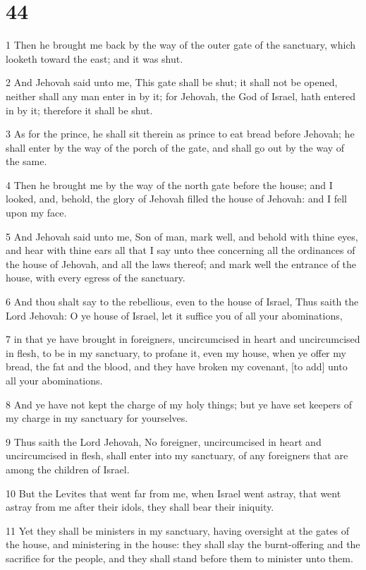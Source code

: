 \chapter{44}

\par 1 Then he brought me back by the way of the outer gate of the sanctuary, which looketh toward the east; and it was shut.
\par 2 And Jehovah said unto me, This gate shall be shut; it shall not be opened, neither shall any man enter in by it; for Jehovah, the God of Israel, hath entered in by it; therefore it shall be shut.
\par 3 As for the prince, he shall sit therein as prince to eat bread before Jehovah; he shall enter by the way of the porch of the gate, and shall go out by the way of the same.
\par 4 Then he brought me by the way of the north gate before the house; and I looked, and, behold, the glory of Jehovah filled the house of Jehovah: and I fell upon my face.
\par 5 And Jehovah said unto me, Son of man, mark well, and behold with thine eyes, and hear with thine ears all that I say unto thee concerning all the ordinances of the house of Jehovah, and all the laws thereof; and mark well the entrance of the house, with every egress of the sanctuary.
\par 6 And thou shalt say to the rebellious, even to the house of Israel, Thus saith the Lord Jehovah: O ye house of Israel, let it suffice you of all your abominations,
\par 7 in that ye have brought in foreigners, uncircumcised in heart and uncircumcised in flesh, to be in my sanctuary, to profane it, even my house, when ye offer my bread, the fat and the blood, and they have broken my covenant, [to add] unto all your abominations.
\par 8 And ye have not kept the charge of my holy things; but ye have set keepers of my charge in my sanctuary for yourselves.
\par 9 Thus saith the Lord Jehovah, No foreigner, uncircumcised in heart and uncircumcised in flesh, shall enter into my sanctuary, of any foreigners that are among the children of Israel.
\par 10 But the Levites that went far from me, when Israel went astray, that went astray from me after their idols, they shall bear their iniquity.
\par 11 Yet they shall be ministers in my sanctuary, having oversight at the gates of the house, and ministering in the house: they shall slay the burnt-offering and the sacrifice for the people, and they shall stand before them to minister unto them.
